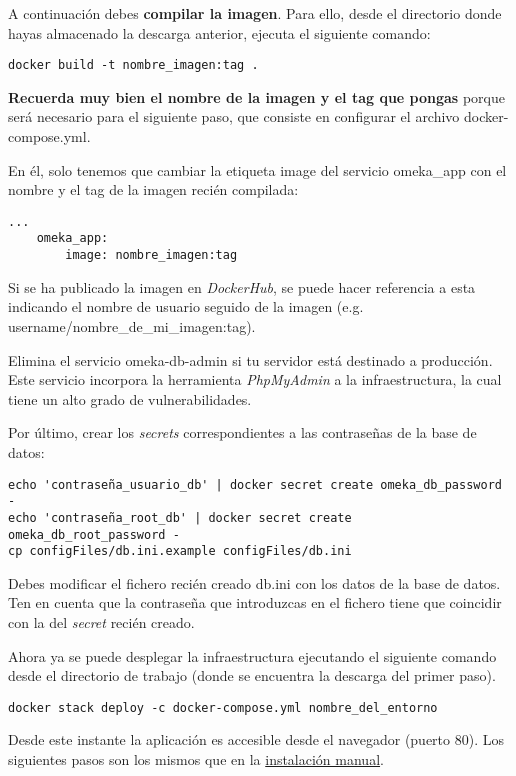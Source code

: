 A continuación debes \textbf{compilar la imagen}. Para ello, desde el
directorio donde hayas almacenado la descarga anterior, ejecuta el
siguiente comando:

\begin{verbatim}
docker build -t nombre_imagen:tag .
\end{verbatim}

\textbf{Recuerda muy bien el nombre de la imagen y el tag que pongas}
porque será necesario para el siguiente paso, que consiste en configurar
el archivo {docker-compose.yml}.

En él, solo tenemos que cambiar la etiqueta {image} del servicio
{omeka\_app} con el nombre y el tag de la imagen recién compilada:

\begin{verbatim}
...
    omeka_app:
        image: nombre_imagen:tag
\end{verbatim} 

Si se ha publicado la imagen en \emph{DockerHub}, se puede hacer
referencia a esta indicando el nombre de usuario seguido de la imagen
(e.g. username/nombre\_de\_mi\_imagen:tag).

Elimina el servicio {omeka-db-admin} si tu servidor está destinado a
producción. Este servicio incorpora la herramienta \emph{PhpMyAdmin} a
la infraestructura, la cual tiene un alto grado de vulnerabilidades.

Por último, crear los \emph{secrets} correspondientes a las contraseñas
de la base de datos:

\begin{verbatim}
echo 'contraseña_usuario_db' | docker secret create omeka_db_password -
echo 'contraseña_root_db' | docker secret create omeka_db_root_password -
cp configFiles/db.ini.example configFiles/db.ini
\end{verbatim} 

Debes modificar el fichero recién creado {db.ini} con los datos de la
base de datos. Ten en cuenta que la contraseña que introduzcas en el
fichero tiene que coincidir con la del \emph{secret} recién creado.

Ahora ya se puede desplegar la infraestructura ejecutando el siguiente
comando desde el directorio de trabajo (donde se encuentra la descarga
del primer paso).

\begin{verbatim}
docker stack deploy -c docker-compose.yml nombre_del_entorno
\end{verbatim} 

Desde este instante la aplicación es accesible desde el navegador
(puerto 80). Los siguientes pasos son los mismos que en la
\href{Manual}{instalación manual}.

